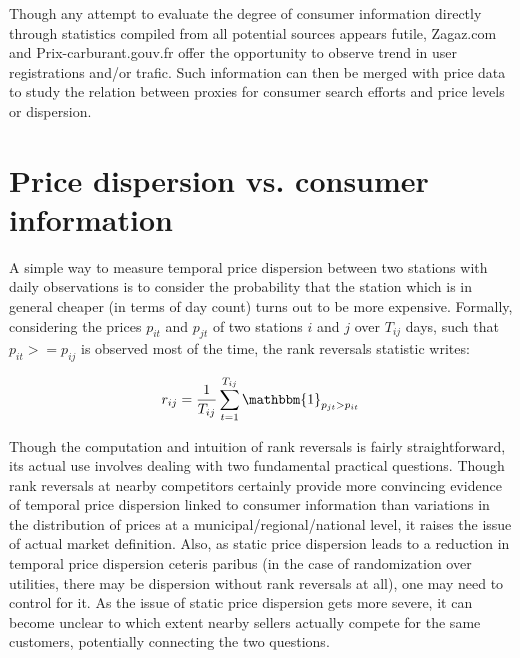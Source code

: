 \documentclass[11pt]{article}
\begin{document}
Though any attempt to evaluate the degree of consumer information directly through statistics compiled from all potential sources appears futile, Zagaz.com and Prix-carburant.gouv.fr offer the opportunity to observe trend in user registrations and/or trafic. Such information can then be merged with price data to study the relation between proxies for consumer search efforts and price levels or dispersion.

\section{Price dispersion vs. consumer information}

A simple way to measure temporal price dispersion between two stations with daily observations is to consider the probability that the station which is in general cheaper (in terms of day count) turns out to be more expensive. Formally, considering the prices $p_{it}$ and $p_{jt}$ of two stations $i$ and $j$ over $T_{ij}$ days, such that $p_{it} >= p_{ij}$ is observed most of the time, the rank reversals statistic writes:

\begin{align*}
r_{ij} = \frac{1}{T_{ij}} \sum_{t=1}^{T_{ij}} \mathbbm{1}_{p_{jt} > p_{it}}
\end{align*}

Though the computation and intuition of rank reversals is fairly straightforward, its actual use involves dealing with two fundamental practical questions. Though rank reversals at nearby competitors certainly provide more convincing evidence of temporal price dispersion linked to consumer information than variations in the distribution of prices at a municipal/regional/national level, it raises the issue of actual market definition. Also, as static price dispersion leads to a reduction in temporal price dispersion ceteris paribus (in the case of randomization over utilities, there may be dispersion without rank reversals at all), one may need to control for it. As the issue of static price dispersion gets more severe, it can become unclear to which extent nearby sellers actually compete for the same customers, potentially connecting the two questions.
\end{document}
